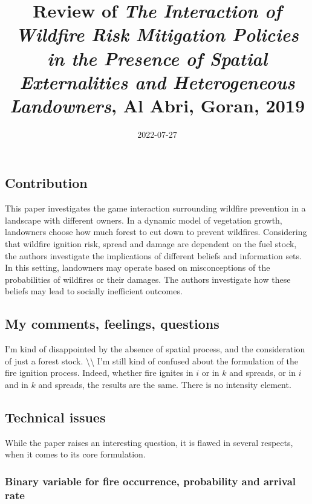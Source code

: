 \documentclass[
]{article}
\title{Review of \emph{The Interaction of Wildfire Risk Mitigation
Policies in the Presence of Spatial Externalities and Heterogeneous
Landowners}, Al Abri, Goran, 2019}
\author{}
\date{\vspace{-2.5em}2022-07-27}
\begin{document}
\maketitle

\hypertarget{contribution}{%
\subsection{Contribution}\label{contribution}}

This paper investigates the game interaction surrounding wildfire
prevention in a landscape with different owners. In a dynamic model of
vegetation growth, landowners choose how much forest to cut down to
prevent wildfires. Considering that wildfire ignition risk, spread and
damage are dependent on the fuel stock, the authors investigate the
implications of different beliefs and information sets. In this setting,
landowners may operate based on misconceptions of the probabilities of
wildfires or their damages. The authors investigate how these beliefs
may lead to socially inefficient outcomes.

\hypertarget{my-comments-feelings-questions}{%
\subsection{My comments, feelings,
questions}\label{my-comments-feelings-questions}}

I'm kind of disappointed by the absence of spatial process, and the
consideration of just a forest stock. \textbackslash\textbackslash{} I'm
still kind of confused about the formulation of the fire ignition
process. Indeed, whether fire ignites in \(i\) or in \(k\) and spreads,
or in \(i\) and in \(k\) and spreads, the results are the same. There is
no intensity element.

\hypertarget{technical-issues}{%
\subsection{Technical issues}\label{technical-issues}}

While the paper raises an interesting question, it is flawed in several
respects, when it comes to its core formulation.

\hypertarget{binary-variable-for-fire-occurrence-probability-and-arrival-rate}{%
\subsubsection{Binary variable for fire occurrence, probability and
arrival
rate}\label{binary-variable-for-fire-occurrence-probability-and-arrival-rate}}
\end{document}
